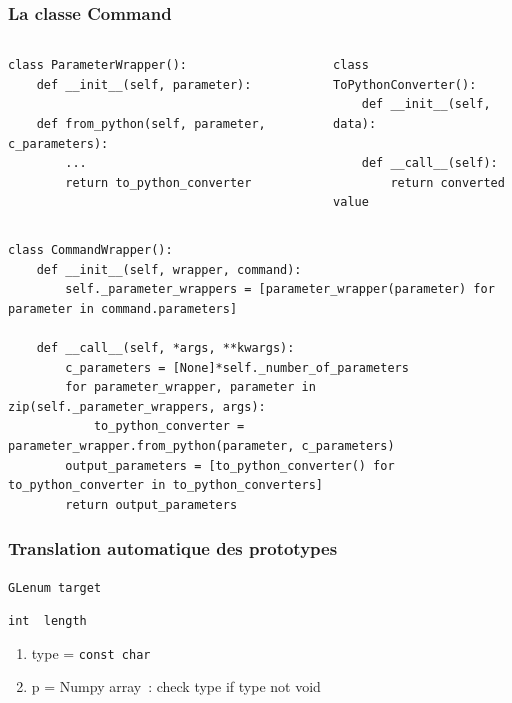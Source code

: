 \begin{frame}[fragile]
  \frametitle{La classe Command}
  {\tiny
    \begin{columns}
      \begin{column}{.5\textwidth}
\begin{verbatim}
class ParameterWrapper():
    def __init__(self, parameter):

    def from_python(self, parameter, c_parameters):
        ...
        return to_python_converter
\end{verbatim}
      \end{column}        
      \begin{column}{.5\textwidth}
\begin{verbatim}
class ToPythonConverter():
    def __init__(self, data):

    def __call__(self):
        return converted value
\end{verbatim}
    \end{column}
  \end{columns}
\begin{verbatim}
class CommandWrapper():
    def __init__(self, wrapper, command):
        self._parameter_wrappers = [parameter_wrapper(parameter) for parameter in command.parameters]

    def __call__(self, *args, **kwargs):
        c_parameters = [None]*self._number_of_parameters
        for parameter_wrapper, parameter in zip(self._parameter_wrappers, args):
            to_python_converter = parameter_wrapper.from_python(parameter, c_parameters)
        output_parameters = [to_python_converter() for to_python_converter in to_python_converters]
        return output_parameters
\end{verbatim}}
\end{frame}

\begin{frame}
  \frametitle{Translation automatique des prototypes}
  \begin{description}
    \item[simple] \texttt{GLenum target} \\
    \item[output par référence] \texttt{int \alert{\ptr [1]} length} \\
    \item[Pointeur Complexe]
      \begin{enumerate}
      \item type = \texttt{const char \ptr}
      \item p = Numpy array~: check type if type not void
      \end{enumerate}
  \end{description}
\end{frame}

